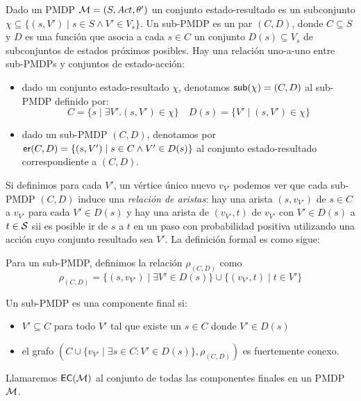 \begin{definition}
	Dado un PMDP $\mathcal{M} = (S, Act, \theta')$ un conjunto estado-resultado es un subconjunto $\chi \subseteq \{(s, V') \mid s \in S \wedge V' \in V_s\}$. Un sub-PMDP es un par $(C, D)$, donde $C \subseteq S$ y $D$ es una función que asocia a cada $s \in C$ un conjunto $D(s) \subseteq V_s$ de subconjuntos de estados próximos posibles. Hay una relación uno-a-uno entre sub-PMDPs y conjuntos de estado-acción:

	\begin{itemize}
		\item dado un conjunto estado-resultado $\chi$, denotamos $\textsf{sub}(\chi) = (C, D)$ al
		      sub-PMDP definido por:
		      \[
			      C = \{s \mid \exists V' . (s, V') \in \chi\} \quad D(s) = \{V' \mid (s, V') \in \chi\}
		      \]

		\item dado un sub-PMDP $(C, D)$, denotamos por $\textsf{er}(C,D) = \{(s,V') \mid s \in C
			      \wedge V' \in D(s)\}$ al conjunto estado-resultado correspondiente a $(C, D)$.
	\end{itemize}
\end{definition}

Si definimos para cada $V'$, un vértice único nuevo $v_{V'}$ podemos ver que
cada sub-PMDP $(C, D)$ induce una \textit{relación de aristas}: hay una arista
$(s, v_{V'})$ de $s \in C$ a $v_{V'}$ para cada $V' \in D(s)$ y hay una arista
de $(v_{V'}, t)$ de $v_{V'}$ con $V' \in D(s)$ a $t \in \mathcal{S}$ sii es posible ir
de $s$ a $t$ en un paso con probabilidad positiva utilizando una acción cuyo
conjunto resultado sea $V'$. La definición formal es como sigue:

\begin{definition}
	Para un sub-PMDP, definimos la relación $\rho_{(C,D)}$ como
	\[
		\rho_{(C,D)} = \{(s, v_{V'}) \mid \exists V' \in D(s)\} \cup \{(v_{V'}, t) \mid t \in V' \}
	\]
\end{definition}

\begin{definition} \label{defEC}
	Un sub-PMDP es una componente final si:

	\begin{itemize}
		\item $V' \subseteq C$ para todo $V'$ tal que existe un $s \in C$ donde $V' \in D(s)$

		\item el grafo $(C \cup \{v_{V'} \mid \exists s \in C : V' \in D(s)\}, \rho_{(C,D)})$
		      es fuertemente conexo.
	\end{itemize}

	Llamaremos $\textsf{EC}(\mathcal{M})$ al conjunto de todas las componentes finales en un PMDP
	$\mathcal{M}$.
\end{definition}

